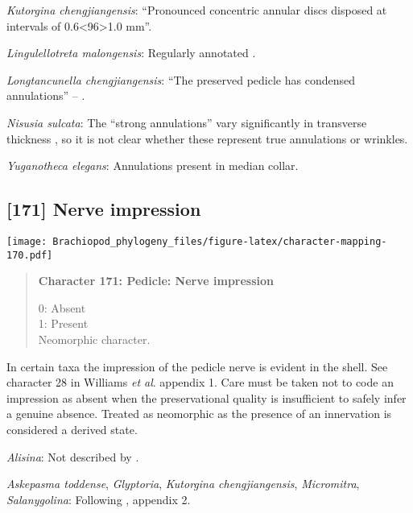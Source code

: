 \documentclass[openany]{book}
\theoremstyle{definition}
\theoremstyle{definition}
\theoremstyle{definition}
\theoremstyle{remark}
\begin{document}
\hypertarget{Kutorgina_chengjiangensis-coding-170}{}
\emph{Kutorgina chengjiangensis}: ``Pronounced concentric annular discs
disposed at intervals of 0.6\textless{}96\textgreater{}1.0 mm''.

\hypertarget{Lingulellotreta_malongensis-coding-170}{}
\emph{Lingulellotreta malongensis}: Regularly annotated \citep[see fig.
14.9 in][]{Hou2017Brachiopoda}.

\hypertarget{Longtancunella_chengjiangensis-coding-170}{}
\emph{Longtancunella chengjiangensis}: ``The preserved pedicle has
condensed annulations'' -- \citet{Zhang2011Theexceptionally}.

\hypertarget{Nisusia_sulcata-coding-170}{}
\emph{Nisusia sulcata}: The ``strong annulations'' vary significantly in
transverse thickness \citep{Holmer2018Evolutionarysignificance}, so it
is not clear whether these represent true annulations or wrinkles.

\hypertarget{Yuganotheca_elegans-coding-170}{}
\emph{Yuganotheca elegans}: Annulations present in median collar.

\subsection*{{[}171{]} Nerve impression}\label{nerve-impression}

\texttt{[image: Brachiopod\_phylogeny\_files/figure-latex/character-mapping-170.pdf]}

\begin{quote}
\textbf{Character 171: Pedicle: Nerve impression}

0: Absent\\
1: Present\\
Neomorphic character.
\end{quote}

In certain taxa the impression of the pedicle nerve is evident in the
shell. See character 28 in Williams \emph{et al}.
\citeyearpar{Williams1998Thediversity} appendix 1. Care must be taken
not to code an impression as absent when the preservational quality is
insufficient to safely infer a genuine absence. Treated as neomorphic as
the presence of an innervation is considered a derived state.

\hypertarget{Alisina-coding-171}{}
\emph{Alisina}: Not described by
\citet{Williams2000LinguliformeaCraniiformea}.

\hypertarget{Askepasma_toddense-coding-171}{}
\emph{Askepasma toddense}, \emph{Glyptoria}, \emph{Kutorgina
chengjiangensis}, \emph{Micromitra}, \emph{Salanygolina}: Following
\citet{Williams1998Thediversity}, appendix 2.
\end{document}
